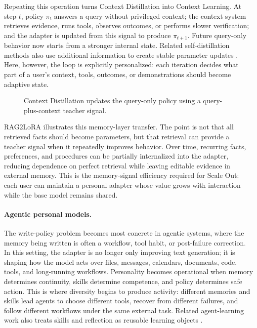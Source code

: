 Repeating this operation turns Context Distillation into Context Learning. At step \(t\), policy \(\pi_t\) answers a query without privileged context; the context system retrieves evidence, runs tools, observes outcomes, or performs slower verification; and the adapter is updated from this signal to produce \(\pi_{t+1}\). Future query-only behavior now starts from a stronger internal state. Related self-distillation methods also use additional information to create stable parameter updates \citep{hubotter2026selfdistillation,shenfeld2026continualselfdistillation}. Here, however, the loop is explicitly personalized: each iteration decides what part of a user's context, tools, outcomes, or demonstrations should become adaptive state.


\begin{figure}[tbp]
\centering
\resizebox{0.96\textwidth}{!}{}
\caption{Context Distillation updates the query-only policy using a query-plus-context teacher signal.}\label{fig:context-distillation}
\end{figure}

RAG2LoRA illustrates this memory-layer transfer. The point is not that all retrieved facts should become parameters, but that retrieval can provide a teacher signal when it repeatedly improves behavior. Over time, recurring facts, preferences, and procedures can be partially internalized into the adapter, reducing dependence on perfect retrieval while leaving editable evidence in external memory. This is the memory-signal efficiency required for Scale Out: each user can maintain a personal adapter whose value grows with interaction while the base model remains shared.

\paragraph{Agentic personal models.}
The write-policy problem becomes most concrete in agentic systems, where the memory being written is often a workflow, tool habit, or post-failure correction. In this setting, the adapter is no longer only improving text generation; it is shaping how the model acts over files, messages, calendars, documents, code, tools, and long-running workflows. Personality becomes operational when memory determines continuity, skills determine competence, and policy determines safe action. This is where diversity begins to produce activity: different memories and skills lead agents to choose different tools, recover from different failures, and follow different workflows under the same external task. Related agent-learning work also treats skills and reflection as reusable learning objects \citep{shinn2023reflexion,xia2026skillrl}.

